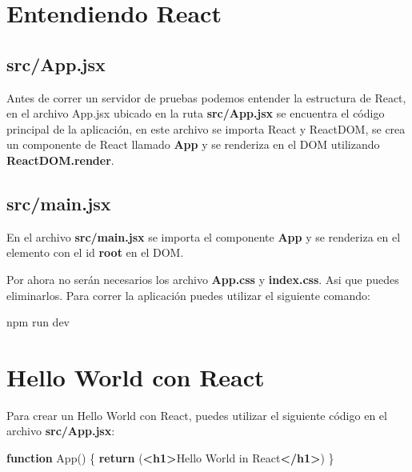 \documentclass[
  a4paper,
  DIV=11,
  numbers=noendperiod,
  onepage,
  openany]{scrreprt}
\newenvironment{Shaded}{\begin{snugshade}}{\end{snugshade}}
\newcommand{\ControlFlowTok}[1]{\textcolor[rgb]{0.00,0.23,0.31}{\textbf{#1}}}
\newcommand{\ExtensionTok}[1]{\textcolor[rgb]{0.00,0.23,0.31}{#1}}
\newcommand{\FunctionTok}[1]{\textcolor[rgb]{0.28,0.35,0.67}{#1}}
\newcommand{\KeywordTok}[1]{\textcolor[rgb]{0.00,0.23,0.31}{\textbf{#1}}}
\newcommand{\NormalTok}[1]{\textcolor[rgb]{0.00,0.23,0.31}{#1}}
\begin{document}
\begin{tcolorbox}
\section{Entendiendo React}\label{entendiendo-react}

\subsection{src/App.jsx}\label{srcapp.jsx}

Antes de correr un servidor de pruebas podemos entender la estructura de
React, en el archivo App.jsx ubicado en la ruta \textbf{src/App.jsx} se
encuentra el código principal de la aplicación, en este archivo se
importa React y ReactDOM, se crea un componente de React llamado
\textbf{App} y se renderiza en el DOM utilizando
\textbf{ReactDOM.render}.

\subsection{src/main.jsx}\label{srcmain.jsx}

En el archivo \textbf{src/main.jsx} se importa el componente
\textbf{App} y se renderiza en el elemento con el id \textbf{root} en el
DOM.

Por ahora no serán necesarios los archivo \textbf{App.css} y
\textbf{index.css}. Asi que puedes eliminarlos. Para correr la
aplicación puedes utilizar el siguiente comando:

\begin{Shaded}
\begin{Highlighting}[]
\ExtensionTok{npm}\NormalTok{ run dev}
\end{Highlighting}
\end{Shaded}

\section{Hello World con React}\label{hello-world-con-react}

Para crear un Hello World con React, puedes utilizar el siguiente código
en el archivo \textbf{src/App.jsx}:

\begin{Shaded}
\begin{Highlighting}[]
\KeywordTok{function} \FunctionTok{App}\NormalTok{() \{}
  \ControlFlowTok{return}\NormalTok{ (}\KeywordTok{\textless{}h1\textgreater{}}\NormalTok{Hello World in React}\KeywordTok{\textless{}/h1\textgreater{}}\NormalTok{)}
\NormalTok{\}}


\end{Highlighting}
\end{Shaded}
\end{tcolorbox}
\end{document}
